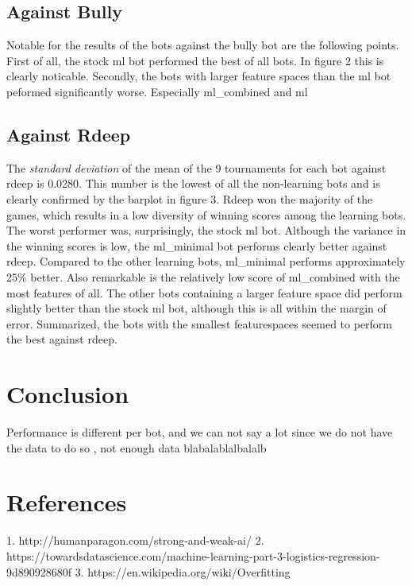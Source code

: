 \documentclass[a4paper,11pt]{article}
\begin{document}
\subsection*{Against Bully}

Notable for the results of the bots against the bully bot are the following points. First of all, the stock ml bot performed the best of all bots. In figure 2 this is clearly noticable. Secondly,  the bots with larger feature spaces than the ml bot peformed significantly worse. Especially ml\_combined and ml


\subsection*{Against Rdeep}
The \textit{standard deviation} of the mean of the 9 tournaments for each bot against rdeep is 0.0280. This number is the lowest of all the non-learning bots and is clearly confirmed by the barplot in figure 3. Rdeep won the majority of the games, which results in a low diversity of winning scores among the learning bots. The worst performer was, surprisingly, the stock ml bot. Although the variance in the winning scores is low, the ml\_minimal bot performs clearly better against rdeep. Compared to the other learning bots, ml\_minimal performs approximately 25\% better. Also remarkable is the relatively low score of ml\_combined with the most features of all. The other bots containing a larger feature space did perform slightly better than the stock ml bot, although this is all within the margin of error.  Summarized, the bots with the smallest featurespaces seemed to perform the best against rdeep.







\section{Conclusion}
Performance is different per bot, and we can not say a lot since we do not have the data to do so , not enough data blabalablalbalalb





\section{References}
1. http://humanparagon.com/strong-and-weak-ai/
2. https://towardsdatascience.com/machine-learning-part-3-logistics-regression-9d890928680f
3. https://en.wikipedia.org/wiki/Overfitting
\end{document}
